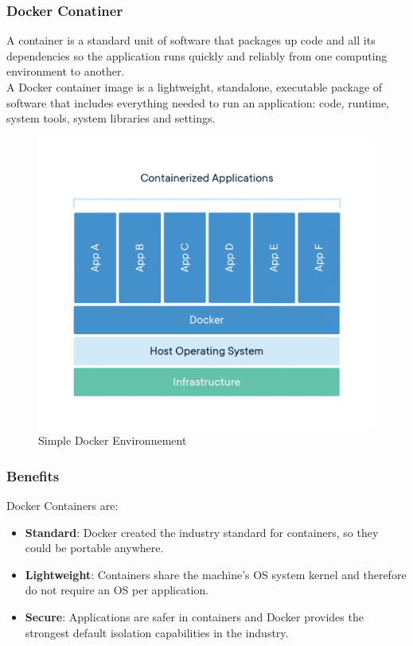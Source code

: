 \subsubsection{Docker Conatiner}
A container is a standard unit of software that packages up code and all its dependencies so the application runs quickly and reliably from one computing environment to another. \\A Docker container image is a lightweight, standalone, executable package of software that includes everything needed to run an application: code, runtime, system tools, system libraries and settings.
\begin{figure}[!htb]
    \begin{center}
        \includegraphics[scale=0.2]{images/container.png}
    \end{center}
    \caption[Docker Architecture Overview]{Simple Docker Environnement}
\end{figure}
\subsubsection{Benefits}
Docker Containers are:
\begin{itemize}
    \item \textbf{Standard}: Docker created the industry standard for containers, so they could be portable anywhere.
    \item \textbf{Lightweight}: Containers share the machine’s OS system kernel and therefore do not require an OS per application.
    \item \textbf{Secure}:  Applications are safer in containers and Docker provides the strongest default isolation capabilities in the industry.
\end{itemize}

